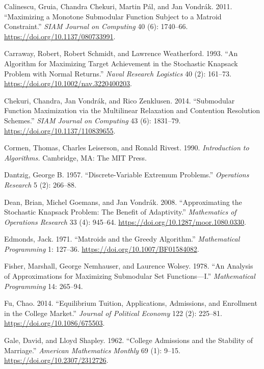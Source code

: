 \documentclass[11pt]{article} %
\theoremstyle{definition}
\theoremstyle{definition}
\begin{document}
Calinescu, Gruia, Chandra Chekuri, Martin Pál, and Jan Vondrák. 2011. ``Maximizing a Monotone Submodular Function Subject to a Matroid Constraint.'' \emph{SIAM Journal on Computing} 40 (6): 1740--66. \url{https://doi.org/10.1137/080733991}.

Carraway, Robert, Robert Schmidt, and Lawrence Weatherford. 1993. ``An Algorithm for Maximizing Target Achievement in the Stochastic Knapsack Problem with Normal Returns.'' \emph{Naval Research Logistics} 40 (2): 161--73. \url{https://doi.org/10.1002/nav.3220400203}.

Chekuri, Chandra, Jan Vondr\'ak, and Rico Zenklusen. 2014. ``Submodular Function Maximization via the Multilinear Relaxation and Contention Resolution Schemes.'' \emph{SIAM Journal on Computing} 43 (6): 1831--79. \url{https://doi.org/10.1137/110839655}.

Cormen, Thomas, Charles Leiserson, and Ronald Rivest. 1990. \emph{Introduction to Algorithms.} Cambridge, MA: The MIT Press.

Dantzig, George B. 1957. ``Discrete-Variable Extremum Problems.'' \emph{Operations Research} 5 (2): 266--88.

Dean, Brian, Michel Goemans, and Jan Vondr\'ak. 2008. ``Approximating the Stochastic Knapsack Problem: The Benefit of Adaptivity.'' \emph{Mathematics of Operations Research} 33 (4): 945--64. \url{https://doi.org/10.1287/moor.1080.0330}.

Edmonds, Jack. 1971. ``Matroids and the Greedy Algorithm.'' \emph{Mathematical Programming} 1: 127--36. \url{https://doi.org/10.1007/BF01584082}.  

Fisher, Marshall, George Nemhauser, and Laurence Wolsey. 1978. ``An Analysis of Approximations for Maximizing Submodular Set Functions—I.'' \emph{Mathematical Programming} 14: 265--94. 


Fu, Chao. 2014. ``Equilibrium Tuition, Applications, Admissions, and Enrollment in the College Market.'' \emph{Journal of Political Economy} 122 (2): 225--81. \url{https://doi.org/10.1086/675503}. 

Gale, David, and Lloyd Shapley. 1962. ``College Admissions and the Stability of Marriage.'' \emph{American Mathematics Monthly} 69 (1): 9--15. \url{https://doi.org/10.2307/2312726}.
\end{document}

